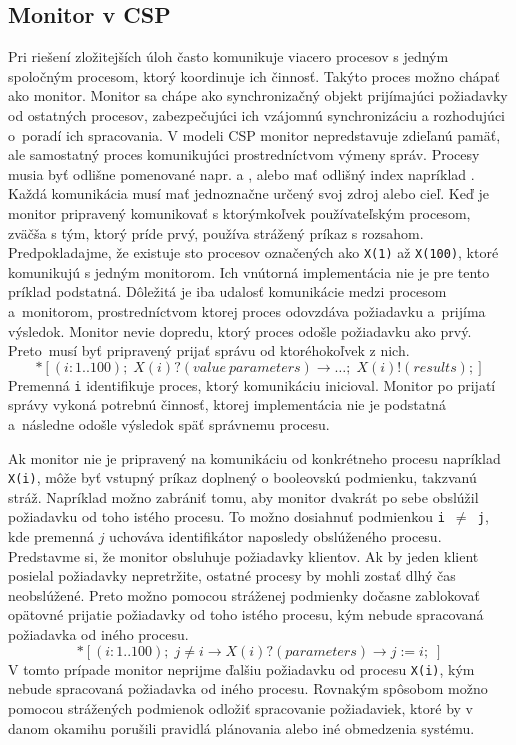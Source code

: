 \documentclass[
  biblatex,
  seconds=true,
  language=slovak,
  figures=false,
  urldate=iso,
  glossaries,
  index
]{kidiplom}
\begin{document}
\subsection{Monitor v CSP}
Pri riešení zložitejších úloh často komunikuje viacero procesov s jedným spoločným procesom, ktorý koordinuje ich činnosť. Takýto proces možno chápať ako monitor. Monitor sa chápe ako synchronizačný objekt prijímajúci požiadavky od ostatných procesov, zabezpečujúci ich vzájomnú synchronizáciu a rozhodujúci o~poradí ich spracovania. V modeli CSP monitor nepredstavuje zdieľanú pamäť, ale samostatný proces komunikujúci prostredníctvom výmeny správ.
Procesy musia byť odlišne pomenované napr.  a ,
alebo mať odlišný index napríklad . Každá komunikácia musí mať jednoznačne určený svoj zdroj alebo cieľ. Keď je monitor pripravený komunikovať
s ktorýmkoľvek používateľským procesom, zväčša s tým, ktorý príde prvý, používa strážený príkaz s rozsahom.
Predpokladajme, že existuje sto procesov označených ako \texttt{X(1)} až \texttt{X(100)}, ktoré komunikujú s jedným monitorom. Ich vnútorná implementácia nie je pre tento príklad podstatná. Dôležitá je iba udalosť komunikácie medzi procesom a~monitorom, prostredníctvom ktorej proces odovzdáva požiadavku a~prijíma výsledok. Monitor nevie dopredu, ktorý proces odošle požiadavku ako prvý. 
Preto~musí byť pripravený prijať správu od ktoréhokoľvek z nich.
\[
	*[(i:1..100);\; X(i)?(value\ parameters) \rightarrow \dots ;\; X(i)!(results);]
\]
Premenná \texttt{i} identifikuje proces, ktorý komunikáciu inicioval. Monitor po prijatí správy vykoná potrebnú činnosť, ktorej implementácia nie je podstatná a~následne odošle výsledok späť správnemu procesu.

Ak monitor nie je pripravený na komunikáciu od konkrétneho procesu napríklad \texttt{X(i)}, môže byť vstupný príkaz doplnený o booleovskú podmienku,
takzvanú stráž. Napríklad možno zabrániť tomu, aby monitor dvakrát po sebe obslúžil požiadavku od toho istého procesu. To možno dosiahnuť podmienkou \texttt{i $\neq$ j}, kde premenná $j$ uchováva identifikátor naposledy obslúženého procesu.
Predstavme si, že monitor obsluhuje požiadavky klientov. Ak by jeden klient posielal požiadavky nepretržite, ostatné procesy by mohli zostať dlhý čas neobslúžené. Preto možno pomocou stráženej podmienky dočasne zablokovať opätovné prijatie požiadavky od toho istého procesu, kým nebude spracovaná požiadavka od iného procesu.
\[
	*[(i:1..100);\; j\neq i \rightarrow X(i)?(parameters) \rightarrow j := i ;\;]
\]
V tomto prípade monitor neprijme ďalšiu požiadavku od procesu \texttt{X(i)}, kým nebude spracovaná požiadavka od iného procesu.
Rovnakým spôsobom možno pomocou strážených podmienok odložiť spracovanie požiadaviek, ktoré by v danom okamihu porušili pravidlá plánovania alebo iné obmedzenia systému.
\end{document}
